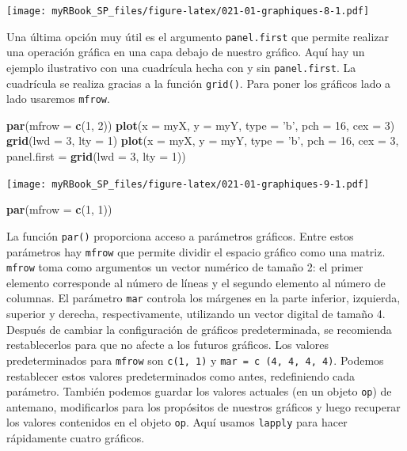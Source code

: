 \documentclass[
]{book}
\newenvironment{Shaded}{\begin{snugshade}}{\end{snugshade}}
\newcommand{\DataTypeTok}[1]{\textcolor[rgb]{0.13,0.29,0.53}{#1}}
\newcommand{\DecValTok}[1]{\textcolor[rgb]{0.00,0.00,0.81}{#1}}
\newcommand{\KeywordTok}[1]{\textcolor[rgb]{0.13,0.29,0.53}{\textbf{#1}}}
\newcommand{\NormalTok}[1]{#1}
\newcommand{\StringTok}[1]{\textcolor[rgb]{0.31,0.60,0.02}{#1}}
\begin{document}
\texttt{[image: myRBook\_SP\_files/figure-latex/021-01-graphiques-8-1.pdf]}

Una última opción muy útil es el argumento \texttt{panel.first} que permite realizar una operación gráfica en una capa debajo de nuestro gráfico. Aquí hay un ejemplo ilustrativo con una cuadrícula hecha con y sin \texttt{panel.first}. La cuadrícula se realiza gracias a la función \texttt{grid()}. Para poner los gráficos lado a lado usaremos \texttt{mfrow}.

\begin{Shaded}
\begin{Highlighting}[]
\KeywordTok{par}\NormalTok{(}\DataTypeTok{mfrow =} \KeywordTok{c}\NormalTok{(}\DecValTok{1}\NormalTok{, }\DecValTok{2}\NormalTok{))}
\KeywordTok{plot}\NormalTok{(}\DataTypeTok{x =}\NormalTok{ myX, }\DataTypeTok{y =}\NormalTok{ myY, }
  \DataTypeTok{type =} \StringTok{'b'}\NormalTok{, }\DataTypeTok{pch =} \DecValTok{16}\NormalTok{, }\DataTypeTok{cex =} \DecValTok{3}\NormalTok{) }
\KeywordTok{grid}\NormalTok{(}\DataTypeTok{lwd =} \DecValTok{3}\NormalTok{, }\DataTypeTok{lty =} \DecValTok{1}\NormalTok{)}
\KeywordTok{plot}\NormalTok{(}\DataTypeTok{x =}\NormalTok{ myX, }\DataTypeTok{y =}\NormalTok{ myY, }
  \DataTypeTok{type =} \StringTok{'b'}\NormalTok{, }\DataTypeTok{pch =} \DecValTok{16}\NormalTok{, }\DataTypeTok{cex =} \DecValTok{3}\NormalTok{, }
  \DataTypeTok{panel.first =} \KeywordTok{grid}\NormalTok{(}\DataTypeTok{lwd =} \DecValTok{3}\NormalTok{, }\DataTypeTok{lty =} \DecValTok{1}\NormalTok{)) }
\end{Highlighting}
\end{Shaded}

\texttt{[image: myRBook\_SP\_files/figure-latex/021-01-graphiques-9-1.pdf]}

\begin{Shaded}
\begin{Highlighting}[]
\KeywordTok{par}\NormalTok{(}\DataTypeTok{mfrow =} \KeywordTok{c}\NormalTok{(}\DecValTok{1}\NormalTok{, }\DecValTok{1}\NormalTok{))}
\end{Highlighting}
\end{Shaded}

La función \texttt{par()} proporciona acceso a parámetros gráficos. Entre estos parámetros hay \texttt{mfrow} que permite dividir el espacio gráfico como una matriz. \texttt{mfrow} toma como argumentos un vector numérico de tamaño 2: el primer elemento corresponde al número de líneas y el segundo elemento al número de columnas. El parámetro \texttt{mar} controla los márgenes en la parte inferior, izquierda, superior y derecha, respectivamente, utilizando un vector digital de tamaño 4. Después de cambiar la configuración de gráficos predeterminada, se recomienda restablecerlos para que no afecte a los futuros gráficos. Los valores predeterminados para \texttt{mfrow} son \texttt{c(1,\ 1)} y \texttt{mar\ =\ c\ (4,\ 4,\ 4,\ 4)}. Podemos restablecer estos valores predeterminados como antes, redefiniendo cada parámetro. También podemos guardar los valores actuales (en un objeto \texttt{op}) de antemano, modificarlos para los propósitos de nuestros gráficos y luego recuperar los valores contenidos en el objeto \texttt{op}. Aquí usamos \texttt{lapply} para hacer rápidamente cuatro gráficos.
\end{document}
